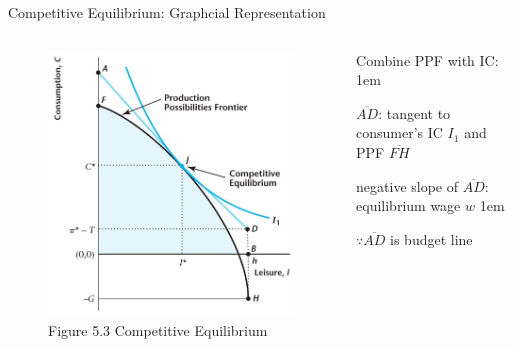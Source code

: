 \documentclass[11pt,aspectratio=43]{beamer}
\let\olditemize=\itemize
\let\endolditemize=\enditemize
\renewenvironment{itemize}{\olditemize \itemsep1em}{\endolditemize}
\theoremstyle{definition}
\begin{document}
\begin{frame}{Competitive Equilibrium: Graphcial Representation}
\label{slide:Competitive_Equilibrium__Graphcial_Representation}
    \begin{columns}
        \begin{column}{0.5\textwidth}
            \begin{figure}
                \caption{\scriptsize Figure 5.3  Competitive Equilibrium}
                \includegraphics[width=\textwidth]{./figures/Figure5_3.jpg}
            \end{figure}
        \end{column}
        \begin{column}{0.5\textwidth}
            Combine PPF with IC:
            \begin{itemize}
                \item $\overline{AD}$: tangent to consumer's IC $ I_{1} $ and PPF $\overline{FH}$
                \item negative slope of $\overline{AD}$: equilibrium wage $ w $
                \begin{itemize}
                    \item $ \because \overline{AD}$ is budget line
                \end{itemize}

\end{itemize}
\end{column}
\end{columns}
\end{frame}
\end{document}
